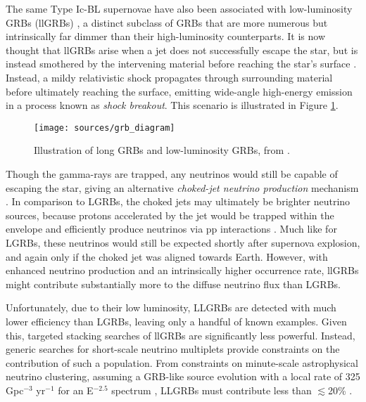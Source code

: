 The same Type Ic-BL supernovae have also been associated with low-luminosity GRBs (llGRBs)  , a distinct subclass of GRBs that are more numerous but intrinsically far dimmer than their high-luminosity counterparts. It is now thought that llGRBs arise when a jet does not successfully escape the star, but is instead smothered by the intervening material before reaching the star's surface . Instead, a mildy relativistic shock propagates through surrounding material before ultimately reaching the surface, emitting wide-angle high-energy emission in a process known as \emph{shock breakout}. This scenario is illustrated in Figure \ref{fig:grb_diagram}.

\begin{figure}[!ht]
	\centering \texttt{[image: sources/grb\_diagram]}
	\caption{Illustration of long GRBs and low-luminosity GRBs, from \cite{nakar_15_llgrb}.}
	\label{fig:grb_diagram}
\end{figure}

Though the gamma-rays are trapped, any neutrinos would still be capable of escaping the star, giving an alternative \emph{choked-jet neutrino production} mechanism . In comparison to LGRBs, the choked jets may ultimately be brighter neutrino sources, because protons accelerated by the jet would be trapped within the envelope and efficiently produce neutrinos via pp interactions \cite{nakar_15_llgrb}. Much like for LGRBs, these neutrinos would still be expected shortly after supernova explosion, and again only if the choked jet was aligned towards Earth. However, with enhanced neutrino production and an intrinsically higher occurrence rate, llGRBs might contribute substantially more to the diffuse neutrino flux than LGRBs. 

Unfortunately, due to their low luminosity, LLGRBs are detected with much lower efficiency than LGRBs, leaving only a handful of known examples. Given this, targeted stacking searches of llGRBs are significantly less powerful. Instead, generic searches for short-scale neutrino multiplets provide constraints on the contribution of such a population. From constraints on minute-scale astrophysical neutrino clustering, assuming a GRB-like source evolution with a local rate of 325 Gpc$^{-3}$ yr$^{-1}$ for an E$^{-2.5}$ spectrum \cite{07_llgrb}, LLGRBs must contribute less than $\lesssim$20\% .

